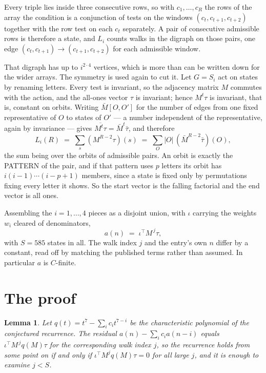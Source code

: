 \documentclass[11pt,a4paper]{article}
\theoremstyle{plain}
\newtheorem{lemma}[theorem]{Lemma}
\theoremstyle{definition}
\begin{document}
Every triple lies inside three consecutive rows, so with $c_1,\dots,c_R$ the rows of the array
the condition is a conjunction of tests on the windows $(c_{t},c_{t+1},c_{t+2})$ together
with the row test on each $c_t$ separately. A pair of consecutive admissible rows is therefore
a state, and $L_i$ counts walks in the digraph on those pairs, one edge $(c_t,c_{t+1})\to
(c_{t+1},c_{t+2})$ for each admissible window.

That digraph has up to $i^{2\cdot4}$ vertices, which is more than can be written down for
the wider arrays. The symmetry is used again to cut it. Let $G=S_i$ act on states by renaming
letters. Every test is invariant, so the adjacency matrix $M$ commutes with the action, and the
all-ones vector $\tau$ is invariant; hence $M^{t}\tau$ is invariant, that is, constant on
orbits. Writing $\bar M[O,O']$ for the number of edges from one fixed representative of $O$ to
states of $O'$ --- a number independent of the representative, again by invariance --- gives
$\overline{M^{t}\tau}=\bar M^{t}\bar\tau$, and therefore
\[
L_i(R)\;=\;\sum_{s}(M^{R-2}\tau)(s)\;=\;\sum_{O}|O|\,(\bar M^{R-2}\bar\tau)(O),
\]
the sum being over the orbits of admissible pairs. An orbit is exactly the PATTERN of the pair,
and if that pattern uses $p$ letters its orbit has $i(i-1)\cdots(i-p+1)$ members, since a state
is fixed only by permutations fixing every letter it shows. So the start vector is the falling
factorial and the end vector is all ones.

Assembling the $i=1,\dots,4$ pieces as a disjoint union, with $\iota$ carrying the weights
$w_i$ cleared of denominators,
\[
a(n)\;=\;\iota^{\!\top}M^{\,j}\tau ,
\]
with $S=585$ states in all. The walk index $j$ and the entry's own $n$ differ by a constant,
read off by matching the published terms rather than assumed. In particular $a$ is $C$-finite.

\section{The proof}

\begin{lemma}\label{lem:crit}
Let $q(t)=t^{7}-\sum_i c_it^{7-i}$ be the characteristic polynomial of the
conjectured recurrence. The residual $a(n)-\sum_ic_ia(n-i)$ equals
$\iota^{\!\top}M^{\,j}q(M)\tau$ for the corresponding walk index $j$, so the recurrence
holds from some point on if and only if $\iota^{\!\top}M^{j}q(M)\tau=0$ for all large $j$,
and it is enough to examine $j<S$.
\end{lemma}
\end{document}
